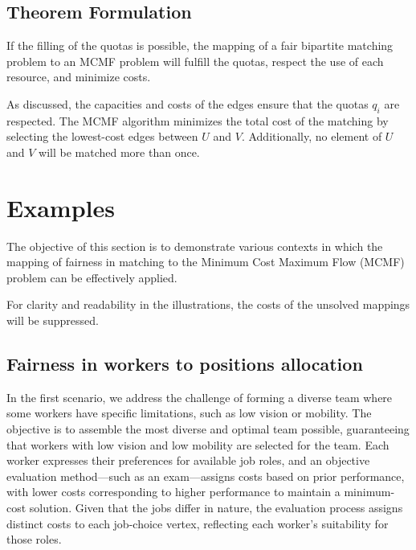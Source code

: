         \subsection{Theorem Formulation}
        
        \begin{theorem}
        If the filling of the quotas is possible, the mapping of a fair bipartite matching problem to an MCMF problem will fulfill the quotas, respect the use of each resource, and minimize costs.
        \end{theorem}
        
        As discussed, the capacities and costs of the edges ensure that the quotas $q_i$ are respected. The MCMF algorithm minimizes the total cost of the matching by selecting the lowest-cost edges between $U$ and $V$. Additionally, no element of $U$ and $V$ will be matched more than once.
        
        \section{Examples}
        The objective of this section is to demonstrate various contexts in which the mapping of fairness in matching to the Minimum Cost Maximum Flow (MCMF) problem can be effectively applied.
        
        For clarity and readability in the illustrations, the costs of the unsolved mappings will be suppressed.
        
        \subsection{Fairness in workers to positions allocation}
        \label{sec:workers_jobs_example}

        In the first scenario, we address the challenge of forming a diverse team where some workers have specific limitations, such as low vision or mobility. 
        The objective is to assemble the most diverse and optimal team possible, guaranteeing that workers with low vision and low mobility are selected for the team. 
        Each worker expresses their preferences for available job roles, and an objective evaluation method---such as an exam---assigns costs based on prior performance, with lower costs corresponding to higher performance to maintain a minimum-cost solution. Given that the jobs differ in nature, the evaluation process assigns distinct costs to each job-choice vertex, reflecting each worker's suitability for those roles.
        
